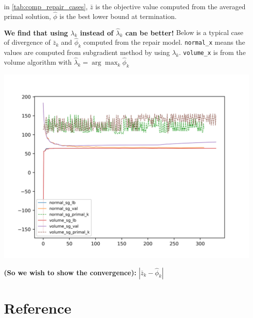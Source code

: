 \documentclass[
  a4paper,
,tablecaptionabove
]{scrartcl}
\numberwithin{equation}{section}
\begin{document}
\normalsize
in \ref{tab:comp_repair_cases}, $\bar z$ is the objective value computed from the averaged primal solution,
$\hat \phi$ is the best lower bound at termination.

\textbf{We find that using \(\lambda_{k}\) instead of
  \(\hat \lambda_{k}\) can be better!} Below is a typical case of
divergence of \(\bar z_k\) and \(\hat \phi_k\) computed from the repair
model. \texttt{normal\_x} means the values are computed from subgradient
method by using \(\lambda_{k}\). \texttt{volume\_x} is from the volume
algorithm with \(\hat \lambda_{k} = \arg\max_k \hat \phi_{k}\)

\includegraphics{imgs/conv_0_15_15.png}

\textbf{(So we wish to show the convergence):}
\(|\bar z_k -\hat \phi_k|\)

\hypertarget{reference}{%
  \section*{Reference}\label{reference}}
\end{document}
